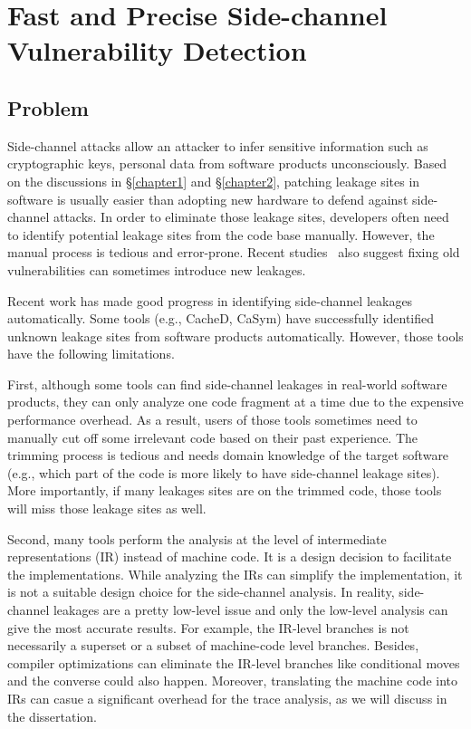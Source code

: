 
\chapter{Fast and Precise Side-channel Vulnerability Detection}\label{chapter3}
\section{Problem}
Side-channel attacks allow an attacker to infer sensitive information such as cryptographic keys, personal data from software products unconsciously. Based on the discussions in \S\ref{chapter1} and \S\ref{chapter2}, patching leakage sites in software is usually easier than adopting new hardware to defend against side-channel attacks. In order to eliminate those leakage sites, developers often need to identify potential leakage sites from the code base manually. However, the manual process is tedious and error-prone. Recent studies~\cite{203878} also suggest fixing old vulnerabilities can sometimes introduce new leakages. 

Recent work has made good progress in identifying side-channel leakages automatically. Some tools (e.g., CacheD, CaSym) have successfully identified unknown leakage sites from software products automatically. However, those tools have the following limitations. 

First, although some tools can find side-channel leakages in real-world software products, they can only analyze one code fragment at a time due to the expensive performance overhead. As a result, users of those tools sometimes need to manually cut off some irrelevant code based on their past experience. The trimming process is tedious and needs domain knowledge of the target software (e.g., which part of the code is more likely to have side-channel leakage sites). More importantly, if many leakages sites are on the trimmed code, those tools will miss those leakage sites as well.

Second, many tools perform the analysis at the level of intermediate representations (IR) instead of machine code. It is a design decision to facilitate the implementations. While analyzing the IRs can simplify the implementation, it is not a suitable design choice for the side-channel analysis. In reality, side-channel leakages are a pretty low-level issue and only the low-level analysis can give the most accurate results. For example, the IR-level branches is not necessarily a superset or a subset of machine-code level branches. Besides, compiler optimizations can eliminate the IR-level branches like conditional moves and the converse could also happen. Moreover, translating the machine code into IRs can casue a significant overhead for the trace analysis, as we will discuss in the dissertation. 

